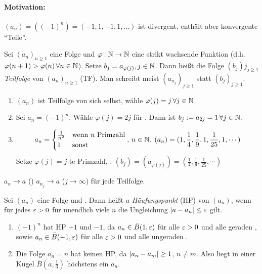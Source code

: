 \documentclass[12pt]{scrreprt}
\begin{document}
\paragraph{Motivation:} $(a_n) = ((-1)^n) = (-1,1,-1,1,\dotsc)$ ist divergent, enthält aber konvergente "`Teile"'.

\begin{dfn}
\label{dfn:konv.teilfolge}
Sei $(a_n)_{n\ge1}$ eine Folge und $\varphi: \mathbb{N} \rightarrow \mathbb{N}$ eine strikt wachsende Funktion (d.h. $\varphi(n+1)>\varphi(n)\,\forall n\in\mathbb{N}$). Setze $b_j=a_{\varphi(j)}, j\in\mathbb{N}$. Dann heißt die Folge $(b_j)j_{j\ge1}$ \emph{Teilfolge} von $(a_n)_{n\ge1}$ (TF). Man schreibt meist  $\left(a_{n_j}\right)_{j\ge1}$ statt $(b_j)_{j\ge1}$.
\end{dfn}

\begin{bsp*}
\begin{enumerate}
\item $(a_n)$ ist Teilfolge von sich selbst, wähle $\varphi(j)=j\,\forall j\in\mathbb{N}$
\item Sei $a_n=(-1)^n$. Wähle $\varphi(j)=2j$ für . Dann ist $b_j:=a_{2j}=1 \,\forall j\in\mathbb{N}$.
\item \[a_n = \begin{cases} \frac{1}{n^2} & \text{wenn } n \text{ Primzahl} \\ 1 & \text{sonst} \end{cases} \text{, } n\in\mathbb{N} \text{. } (a_n) = (1, \frac14, \frac19, 1, \frac{1}{25}, 1, \dotsm)\] Setze $\varphi(j)=j$-te Primzahl, . \folgt $(b_j) = (a_{\varphi(j)}) = (\frac14, \frac19, \frac{1}{25},\dotsm)$
\end{enumerate}
\end{bsp*}

\begin{bem*}
$a_n\to a$ (\ninf) \folgt $a_{n_j}\to a$ ($j\to\infty$) für jede Teilfolge.
\end{bem*}

\begin{dfn}
\label{dfn:konv.hp}
Sei $(a_n)$ eine Folge und . Dann heißt $a$ \emph{Häufungspunkt} (HP) von $(a_n)$, wenn für jedes $\varepsilon>0$ für unendlich viele $n$ die Ungleichung $\left\lvert a-a_n\right\lvert\le\varepsilon$ gilt.
\end{dfn}
\begin{bsp*}
\begin{enumerate}
\item $(-1)^n$ hat HP $+1$ und $-1$, da $a_n\in\bar{B}(1,\varepsilon)$ für alle $\varepsilon>0$ und alle geraden , sowie $a_n\in\bar{B}(-1,\varepsilon)$ für alle $\varepsilon>0$ und alle ungeraden .
\item Die Folge $a_n=n$ hat keinen HP, da $\left\lvert a_n-a_m\right\lvert\ge1$, $n\ne m$. Also liegt in einer Kugel $\bar{B}(a, \frac13)$ höchstens ein $a_n$.
\end{enumerate}
\end{bsp*}
\end{document}
